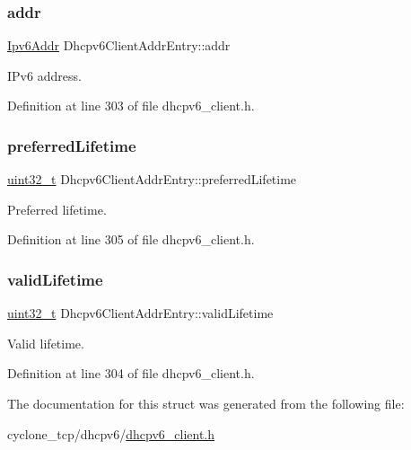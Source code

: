 \subsubsection{\texorpdfstring{addr}{addr}}
{\footnotesize\ttfamily \hyperlink{ipv6_8h_aed0cbc40c61ed5b4fb681ebc55237e89}{Ipv6\+Addr} Dhcpv6\+Client\+Addr\+Entry\+::addr}



I\+Pv6 address. 



Definition at line 303 of file dhcpv6\+\_\+client.\+h.

\mbox{\label{structDhcpv6ClientAddrEntry_a24e1399fe28c7e13c134de1e2953e051}} 
\subsubsection{\texorpdfstring{preferred\+Lifetime}{preferredLifetime}}
{\footnotesize\ttfamily \hyperlink{stdint_8h_a435d1572bf3f880d55459d9805097f62}{uint32\+\_\+t} Dhcpv6\+Client\+Addr\+Entry\+::preferred\+Lifetime}



Preferred lifetime. 



Definition at line 305 of file dhcpv6\+\_\+client.\+h.

\mbox{\label{structDhcpv6ClientAddrEntry_a975d3431d046a9dadc2e6a6594a09168}} 
\subsubsection{\texorpdfstring{valid\+Lifetime}{validLifetime}}
{\footnotesize\ttfamily \hyperlink{stdint_8h_a435d1572bf3f880d55459d9805097f62}{uint32\+\_\+t} Dhcpv6\+Client\+Addr\+Entry\+::valid\+Lifetime}



Valid lifetime. 



Definition at line 304 of file dhcpv6\+\_\+client.\+h.



The documentation for this struct was generated from the following file\+:\begin{DoxyCompactItemize}
\item 
cyclone\+\_\+tcp/dhcpv6/\hyperlink{dhcpv6__client_8h}{dhcpv6\+\_\+client.\+h}\end{DoxyCompactItemize}

